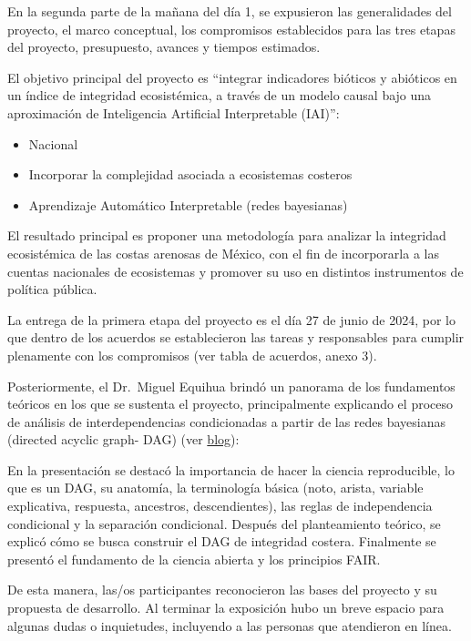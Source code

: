 \documentclass[
  letterpaper,
  DIV=11,
  numbers=noendperiod]{scrreprt}
\begin{document}
En la segunda parte de la mañana del día 1, se expusieron las
generalidades del proyecto, el marco conceptual, los compromisos
establecidos para las tres etapas del proyecto, presupuesto, avances y
tiempos estimados.

El objetivo principal del proyecto es ``integrar indicadores bióticos y
abióticos en un índice de integridad ecosistémica, a través de un modelo
causal bajo una aproximación de Inteligencia Artificial Interpretable
(IAI)'':

\begin{itemize}
\item
  Nacional
\item
  Incorporar la complejidad asociada a ecosistemas costeros
\item
  Aprendizaje Automático Interpretable (redes bayesianas)
\end{itemize}

El resultado principal es proponer una metodología para analizar la
integridad ecosistémica de las costas arenosas de México, con el fin de
incorporarla a las cuentas nacionales de ecosistemas y promover su uso
en distintos instrumentos de política pública.

La entrega de la primera etapa del proyecto es el día 27 de junio de
2024, por lo que dentro de los acuerdos se establecieron las tareas y
responsables para cumplir plenamente con los compromisos (ver tabla de
acuerdos, anexo 3).

Posteriormente, el Dr.~Miguel Equihua brindó un panorama de los
fundamentos teóricos en los que se sustenta el proyecto, principalmente
explicando el proceso de análisis de interdependencias condicionadas a
partir de las redes bayesianas (directed acyclic graph- DAG) (ver
\href{https://sw-costas-arenosas.netlify.app/presentaciones\#category=presentaci\%C3\%B3n}{blog}):

En la presentación se destacó la importancia de hacer la ciencia
reproducible, lo que es un DAG, su anatomía, la terminología básica
(noto, arista, variable explicativa, respuesta, ancestros,
descendientes), las reglas de independencia condicional y la separación
condicional. Después del planteamiento teórico, se explicó cómo se busca
construir el DAG de integridad costera. Finalmente se presentó el
fundamento de la ciencia abierta y los principios FAIR.

De esta manera, las/os participantes reconocieron las bases del proyecto
y su propuesta de desarrollo. Al terminar la exposición hubo un breve
espacio para algunas dudas o inquietudes, incluyendo a las personas que
atendieron en línea.
\end{document}
